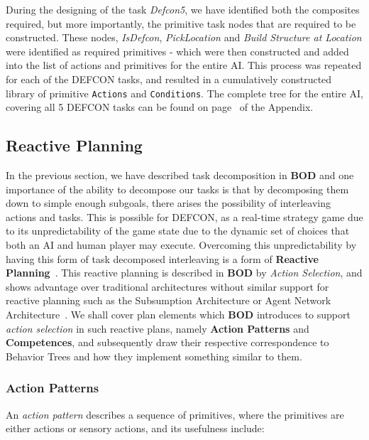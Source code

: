         During the designing of the task \emph{Defcon5}, we have identified both the composites required, but more importantly, the primitive task nodes that are required to be constructed. These nodes, \emph{IsDefcon}, \emph{PickLocation} and \emph{Build Structure at Location} were identified as required primitives - which were then constructed and added into the list of actions and primitives for the entire AI. This process was repeated for each of the DEFCON tasks, and resulted in a cumulatively constructed library of primitive \texttt{Actions} and \texttt{Conditions}. The complete tree for the entire AI, covering all 5 DEFCON tasks can be found on page~\pageref{app:defconbts} of the Appendix.
        
        \newpage
        
        \subsection{Reactive Planning}
        \label{sec:reactiveplanning}
        
        In the previous section, we have described task decomposition in \textbf{BOD} and one importance of the ability to decompose our tasks is that by decomposing them down to simple enough subgoals, there arises the possibility of interleaving actions and tasks. This is possible for DEFCON, as a real-time strategy game due to its unpredictability of the game state due to the dynamic set of choices that both an AI and human player may execute. Overcoming this unpredictability by having this form of task decomposed interleaving is a form of \textbf{Reactive Planning}~\cite{goal-directed-reasoning}. This reactive planning is described in \textbf{BOD} by \emph{Action Selection}, and shows advantage over traditional architectures without similar support for reactive planning such as the Subsumption Architecture or Agent Network Architecture~\cite{bod}. We shall cover plan elements which \textbf{BOD} introduces to support \emph{action selection} in such reactive plans, namely \textbf{Action Patterns} and \textbf{Competences}, and subsequently draw their respective correspondence to Behavior Trees and how they implement something similar to them.
        
        \subsubsection{Action Patterns}
        
        An \emph{action pattern} describes a sequence of primitives, where the primitives are either actions or sensory actions, and its usefulness include:
        
